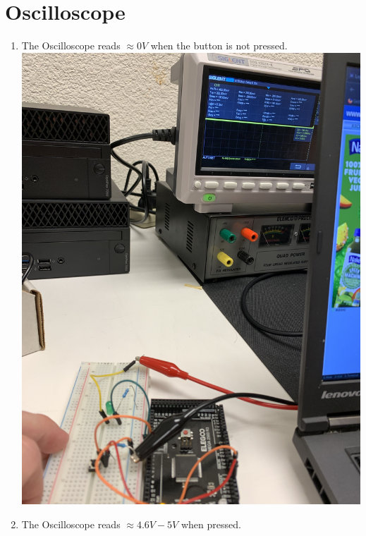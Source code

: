 \documentclass[]{article}
\begin{document}
\section{Oscilloscope}
\begin{enumerate}
	\item The Oscilloscope reads $\approx0V$ when the button is not pressed.\\
	\includegraphics[scale=.06,angle=-90]{4.jpg}\\
	\item The Oscilloscope reads $\approx4.6V-5V$ when pressed.\\

\end{enumerate}
\end{document}
